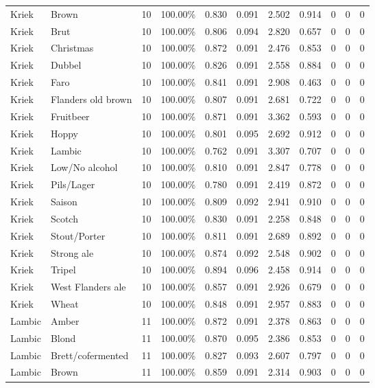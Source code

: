 {\begin{longtable}{llrrrrrrrrr}
Kriek & Brown & 10 & 100.00\% & 0.830 & 0.091 & 2.502 & 0.914 & 0 & 0 & 0 \\
Kriek & Brut & 10 & 100.00\% & 0.806 & 0.094 & 2.820 & 0.657 & 0 & 0 & 0 \\
Kriek & Christmas & 10 & 100.00\% & 0.872 & 0.091 & 2.476 & 0.853 & 0 & 0 & 0 \\
Kriek & Dubbel & 10 & 100.00\% & 0.826 & 0.091 & 2.558 & 0.884 & 0 & 0 & 0 \\
Kriek & Faro & 10 & 100.00\% & 0.841 & 0.091 & 2.908 & 0.463 & 0 & 0 & 0 \\
Kriek & Flanders old brown & 10 & 100.00\% & 0.807 & 0.091 & 2.681 & 0.722 & 0 & 0 & 0 \\
Kriek & Fruitbeer & 10 & 100.00\% & 0.871 & 0.091 & 3.362 & 0.593 & 0 & 0 & 0 \\
Kriek & Hoppy & 10 & 100.00\% & 0.801 & 0.095 & 2.692 & 0.912 & 0 & 0 & 0 \\
Kriek & Lambic & 10 & 100.00\% & 0.762 & 0.091 & 3.307 & 0.707 & 0 & 0 & 0 \\
Kriek & Low/No alcohol & 10 & 100.00\% & 0.810 & 0.091 & 2.847 & 0.778 & 0 & 0 & 0 \\
Kriek & Pils/Lager & 10 & 100.00\% & 0.780 & 0.091 & 2.419 & 0.872 & 0 & 0 & 0 \\
Kriek & Saison & 10 & 100.00\% & 0.809 & 0.092 & 2.941 & 0.910 & 0 & 0 & 0 \\
Kriek & Scotch & 10 & 100.00\% & 0.830 & 0.091 & 2.258 & 0.848 & 0 & 0 & 0 \\
Kriek & Stout/Porter & 10 & 100.00\% & 0.811 & 0.091 & 2.689 & 0.892 & 0 & 0 & 0 \\
Kriek & Strong ale & 10 & 100.00\% & 0.874 & 0.092 & 2.548 & 0.902 & 0 & 0 & 0 \\
Kriek & Tripel & 10 & 100.00\% & 0.894 & 0.096 & 2.458 & 0.914 & 0 & 0 & 0 \\
Kriek & West Flanders ale & 10 & 100.00\% & 0.857 & 0.091 & 2.926 & 0.679 & 0 & 0 & 0 \\
Kriek & Wheat & 10 & 100.00\% & 0.848 & 0.091 & 2.957 & 0.883 & 0 & 0 & 0 \\
Lambic & Amber & 11 & 100.00\% & 0.872 & 0.091 & 2.378 & 0.863 & 0 & 0 & 0 \\
Lambic & Blond & 11 & 100.00\% & 0.870 & 0.095 & 2.386 & 0.853 & 0 & 0 & 0 \\
Lambic & Brett/cofermented & 11 & 100.00\% & 0.827 & 0.093 & 2.607 & 0.797 & 0 & 0 & 0 \\
Lambic & Brown & 11 & 100.00\% & 0.859 & 0.091 & 2.314 & 0.903 & 0 & 0 & 0 \\

\end{longtable}}
